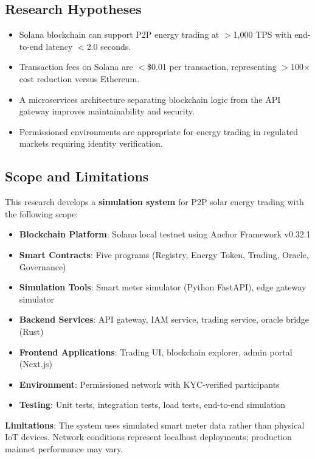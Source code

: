 \documentclass[conference]{IEEEtran}
\begin{document}
\subsection{Research Hypotheses}

\begin{itemize}
    \item[\textbf{H$_1$}] Solana blockchain can support P2P energy trading at $>$1,000 TPS with end-to-end latency $<$2.0 seconds.
    \item[\textbf{H$_2$}] Transaction fees on Solana are $<$\$0.01 per transaction, representing $>$100$\times$ cost reduction versus Ethereum.
    \item[\textbf{H$_3$}] A microservices architecture separating blockchain logic from the API gateway improves maintainability and security.
    \item[\textbf{H$_4$}] Permissioned environments are appropriate for energy trading in regulated markets requiring identity verification.
\end{itemize}

\subsection{Scope and Limitations}

This research develops a \textbf{simulation system} for P2P solar energy trading with the following scope:

\begin{itemize}
    \item \textbf{Blockchain Platform}: Solana local testnet using Anchor Framework v0.32.1
    \item \textbf{Smart Contracts}: Five programs (Registry, Energy Token, Trading, Oracle, Governance)
    \item \textbf{Simulation Tools}: Smart meter simulator (Python FastAPI), edge gateway simulator
    \item \textbf{Backend Services}: API gateway, IAM service, trading service, oracle bridge (Rust)
    \item \textbf{Frontend Applications}: Trading UI, blockchain explorer, admin portal (Next.js)
    \item \textbf{Environment}: Permissioned network with KYC-verified participants
    \item \textbf{Testing}: Unit tests, integration tests, load tests, end-to-end simulation
\end{itemize}

\textbf{Limitations}: The system uses simulated smart meter data rather than physical IoT devices. Network conditions represent localhost deployments; production mainnet performance may vary.
\end{document}
